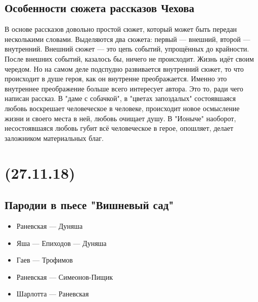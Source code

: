 \documentclass{article}
\begin{document}
\subsection{Особенности сюжета рассказов Чехова}

В основе рассказов довольно простой сюжет, который может быть передан несколькими словами. Выделяются два сюжета:
первый --- внешний, второй --- внутренний. Внешний сюжет --- это цепь событий, упрощённых до крайности. После внешних
событий, казалось бы, ничего не происходит. Жизнь идёт своим чередом. Но на самом деле подспудно развивается внутренний
сюжет, то что происходит в душе героя, как он внутренне преображается. Именно это внутреннее преображение больше всего
интересует автора. Это то, ради чего написан рассказ. В "даме с собачкой", в "цветах запоздалых" состоявшаяся любовь
воскрешает человеческое в человеке, происходит новое осмысление жизни и своего места в ней, любовь очищает душу.
В "Ионыче" наоборот, несостоявшаяся любовь губит всё человеческое в герое, опошляет, делает заложником материальных
благ. 

\newpage
\noindent\makebox[\linewidth]{\rule{\paperwidth}{0.4pt}}
\section{(27.11.18)}
\noindent\makebox[\linewidth]{\rule{\paperwidth}{0.4pt}}

\subsection{Пародии в пьесе "Вишневый сад"}

\begin{itemize}
\item
  Раневская --- Дуняша
\item
  Яша --- Епиходов --- Дуняша
\item
  Гаев --- Трофимов
\item
  Раневская --- Симеонов-Пищик
\item
  Шарлотта --- Раневская
\end{itemize}
\end{document}
